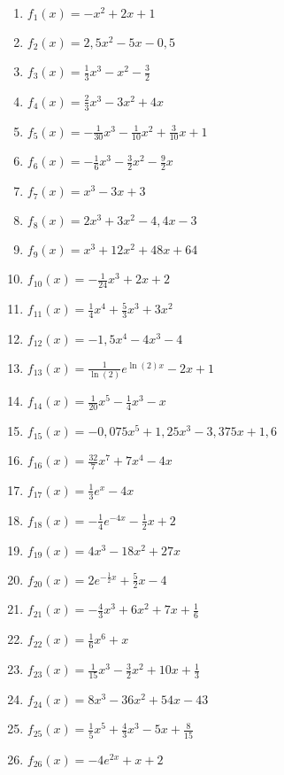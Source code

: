 \begin{Exercise}[title={\raggedright Bestimme die Extrem- und Sattelpunkte.}, label=extrempunkteA1]
	\begin{enumerate}[label=\alph*)]
		\item \(f_1(x)=-x^2+2x+1\)
		\item \(f_2(x)=2,5x^2-5x-0,5\)
		\item \(f_3(x)=\frac{1}{3}x^3-x^2-\frac{3}{2}\)
		\item \(f_4(x)=\frac{2}{3}x^3-3x^2+4x\)
		\item \(f_5(x)=-\frac{1}{30}x^3-\frac{1}{10}x^2+\frac{3}{10}x+1\)
		\item \(f_6(x)=-\frac{1}{6}x^3-\frac{3}{2}x^2-\frac{9}{2}x\)
		\item \(f_7(x)=x^3-3x+3\)
		\item \(f_8(x)=2x^3+3x^2-4,4x-3\)
		\item \(f_9(x)=x^3+12x^2+48x+64\)
		\item \(f_{10}(x)=-\frac{1}{24}x^3+2x+2\)
		\item \(f_{11}(x)=\frac{1}{4}x^4+\frac{5}{3}x^3+3x^2\)
		\item \(f_{12}(x)=-1,5x^4-4x^3-4\)
		\item \(f_{13}(x)=\frac{1}{\ln(2)}e^{\ln(2)x}-2x+1\)
		\item \(f_{14}(x)=\frac{1}{20}x^5-\frac{1}{4}x^3-x\)
		\item \(f_{15}(x)=-0,075x^5+1,25x^3-3,375x+1,6\)
		\item \(f_{16}(x)=\frac{32}{7}x^7+7x^4-4x\)
		\item \(f_{17}(x)=\frac{1}{3}e^x-4x\)
		\item \(f_{18}(x)=-\frac{1}{4}e^{-4x}-\frac{1}{2}x+2\)
		\item \(f_{19}(x)=4x^3-18x^2+27x\)
		\item \(f_{20}(x)=2e^{-\frac{1}{2}x}+\frac{5}{2}x-4\)
		\item \(f_{21}(x)=-\frac{4}{3}x^3+6x^2+7x+\frac{1}{6}\)
		\item \(f_{22}(x)=\frac{1}{6}x^6+x\)
		\item \(f_{23}(x)=\frac{1}{15}x^3-\frac{3}{2}x^2+10x+\frac{1}{3}\)
		\item \(f_{24}(x)=8x^3-36x^2+54x-43\)
		\item \(f_{25}(x)=\frac{1}{5}x^5+\frac{4}{3}x^3-5x+\frac{8}{15}\)
		\item \(f_{26}(x)=-4e^{2x}+x+2\)
	\end{enumerate}
\end{Exercise}

